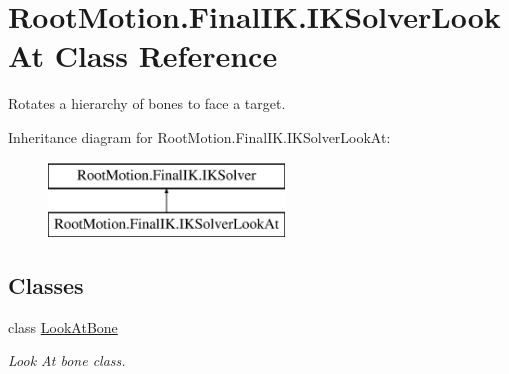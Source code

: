 \hypertarget{class_root_motion_1_1_final_i_k_1_1_i_k_solver_look_at}{}\section{Root\+Motion.\+Final\+I\+K.\+I\+K\+Solver\+Look\+At Class Reference}
\label{class_root_motion_1_1_final_i_k_1_1_i_k_solver_look_at}


Rotates a hierarchy of bones to face a target.  


Inheritance diagram for Root\+Motion.\+Final\+I\+K.\+I\+K\+Solver\+Look\+At\+:\begin{figure}[H]
\begin{center}
\leavevmode
\includegraphics[height=2.000000cm]{class_root_motion_1_1_final_i_k_1_1_i_k_solver_look_at}
\end{center}
\end{figure}
\subsection*{Classes}
\begin{DoxyCompactItemize}
\item 
class \mbox{\hyperlink{class_root_motion_1_1_final_i_k_1_1_i_k_solver_look_at_1_1_look_at_bone}{Look\+At\+Bone}}
\begin{DoxyCompactList}\small\item\em Look At bone class. \end{DoxyCompactList}\end{DoxyCompactItemize}
